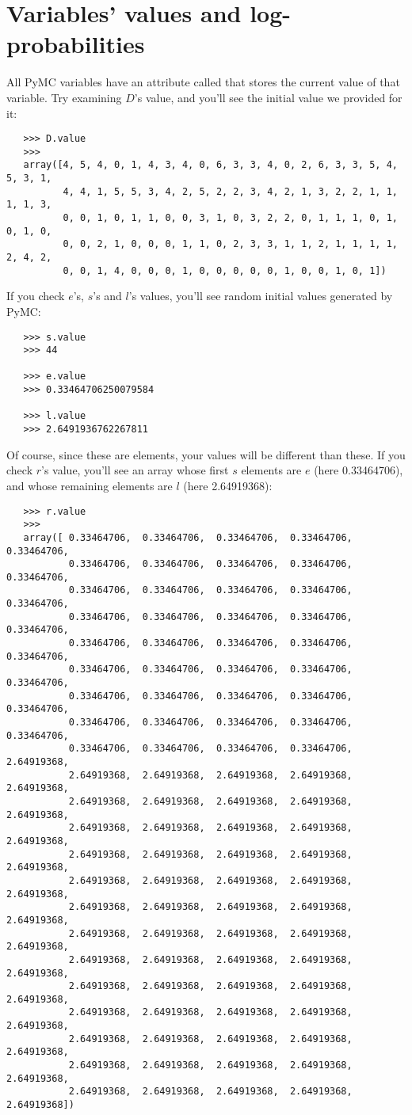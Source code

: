 \section{Variables' values and log-probabilities}
All PyMC variables have an attribute called  that stores the current value of that variable. Try examining $D$'s value, and you'll see the initial value we provided for it:
\begin{verbatim}
   >>> D.value
   >>> 
   array([4, 5, 4, 0, 1, 4, 3, 4, 0, 6, 3, 3, 4, 0, 2, 6, 3, 3, 5, 4, 5, 3, 1,
          4, 4, 1, 5, 5, 3, 4, 2, 5, 2, 2, 3, 4, 2, 1, 3, 2, 2, 1, 1, 1, 1, 3,
          0, 0, 1, 0, 1, 1, 0, 0, 3, 1, 0, 3, 2, 2, 0, 1, 1, 1, 0, 1, 0, 1, 0,
          0, 0, 2, 1, 0, 0, 0, 1, 1, 0, 2, 3, 3, 1, 1, 2, 1, 1, 1, 1, 2, 4, 2,
          0, 0, 1, 4, 0, 0, 0, 1, 0, 0, 0, 0, 0, 1, 0, 0, 1, 0, 1])
\end{verbatim}
If you check $e$'s, $s$'s and $l$'s values, you'll see random initial values generated by PyMC:
\begin{verbatim}
   >>> s.value
   >>> 44

   >>> e.value
   >>> 0.33464706250079584

   >>> l.value
   >>> 2.6491936762267811
\end{verbatim}
Of course, since these are  elements, your values will be different than these. If you check $r$'s value, you'll see an array whose first $s$ elements are $e$ (here 0.33464706), and whose remaining elements are $l$ (here 2.64919368):
\begin{verbatim}
   >>> r.value
   >>> 
   array([ 0.33464706,  0.33464706,  0.33464706,  0.33464706,  0.33464706,
           0.33464706,  0.33464706,  0.33464706,  0.33464706,  0.33464706,
           0.33464706,  0.33464706,  0.33464706,  0.33464706,  0.33464706,
           0.33464706,  0.33464706,  0.33464706,  0.33464706,  0.33464706,
           0.33464706,  0.33464706,  0.33464706,  0.33464706,  0.33464706,
           0.33464706,  0.33464706,  0.33464706,  0.33464706,  0.33464706,
           0.33464706,  0.33464706,  0.33464706,  0.33464706,  0.33464706,
           0.33464706,  0.33464706,  0.33464706,  0.33464706,  0.33464706,
           0.33464706,  0.33464706,  0.33464706,  0.33464706,  2.64919368,
           2.64919368,  2.64919368,  2.64919368,  2.64919368,  2.64919368,
           2.64919368,  2.64919368,  2.64919368,  2.64919368,  2.64919368,
           2.64919368,  2.64919368,  2.64919368,  2.64919368,  2.64919368,
           2.64919368,  2.64919368,  2.64919368,  2.64919368,  2.64919368,
           2.64919368,  2.64919368,  2.64919368,  2.64919368,  2.64919368,
           2.64919368,  2.64919368,  2.64919368,  2.64919368,  2.64919368,
           2.64919368,  2.64919368,  2.64919368,  2.64919368,  2.64919368,
           2.64919368,  2.64919368,  2.64919368,  2.64919368,  2.64919368,
           2.64919368,  2.64919368,  2.64919368,  2.64919368,  2.64919368,
           2.64919368,  2.64919368,  2.64919368,  2.64919368,  2.64919368,
           2.64919368,  2.64919368,  2.64919368,  2.64919368,  2.64919368,
           2.64919368,  2.64919368,  2.64919368,  2.64919368,  2.64919368,
           2.64919368,  2.64919368,  2.64919368,  2.64919368,  2.64919368])
\end{verbatim}
